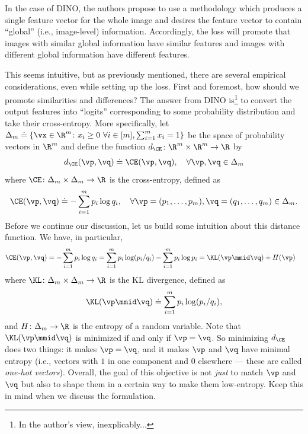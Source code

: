\documentclass[../../book-main.tex]{subfiles}
\begin{document}
In the case of DINO, the authors propose to use a methodology which produces a single feature vector for the whole image and desires the feature vector to contain ``global'' (i.e., image-level) information. Accordingly, the loss will promote that images with similar global information have similar features and images with different global information have different features.

This seems intuitive, but as previously mentioned, there are several empirical considerations, even while setting up the loss. First and foremost, how should we promote similarities and differences? The answer from DINO \citep{caron2021emerging} is\footnote{In the author's view, inexplicably...} to convert the output features into ``logits'' corresponding to some probability distribution and take their cross-entropy. More specifically, let \(\Delta_{m} \doteq \{\vx \in \R^{m} \colon x_{i} \geq 0\ \forall i \in [m], \sum_{i = 1}^{m}x_{i} = 1\}\) be the space of probability vectors in \(\R^{m}\) and define the function \(d_{\CE} \colon \R^{m} \times \R^{m} \to \R\) by
 \begin{equation}\label{eq:cross_entropy_difference}
    d_{\CE}(\vp, \vq) \doteq \CE(\vp, \vq), \quad \forall \vp, \vq \in \Delta_{m}
 \end{equation}
 where \(\CE \colon \Delta_{m} \times \Delta_{m} \to \R\) is the cross-entropy, defined as 
 \begin{equation}\label{eq:expts_def_ce}
    \CE(\vp, \vq) \doteq -\sum_{i = 1}^{m}p_{i}\log q_{i}, \quad \forall \vp = (p_{1}, \dots, p_{m}), \vq = (q_{1}, \dots, q_{m}) \in \Delta_{m}.
 \end{equation}
 Before we continue our discussion, let us build some intuition about this distance function. We have, in particular,
 \begin{align}
    \CE(\vp, \vq)
    &= -\sum_{i = 1}^{m}p_{i}\log q_{i} = \sum_{i = 1}^{m}p_{i}\log(p_{i}/q_{i})
     - \sum_{i = 1}^{m}p_{i}\log p_{i} = \KL(\vp\mmid \vq) + H(\vp)
 \end{align}
 where \(\KL \colon \Delta_{m} \times \Delta_{m} \to \R\) is the KL divergence, defined as 
 \begin{equation}
    \KL(\vp\mmid \vq) \doteq \sum_{i = 1}^{m}p_{i}\log(p_{i}/q_{i}),
 \end{equation}
 and \(H \colon \Delta_{m} \to \R\) is the entropy of a random variable. Note
 that \(\KL(\vp\mmid \vq)\) is minimized if and only if \(\vp = \vq\). So minimizing \(d_{\CE}\) does two things: it makes \(\vp = \vq\), and it makes \(\vp\) and \(\vq\) have minimal entropy (i.e., vectors with \(1\) in one component and \(0\) elsewhere --- these are called \textit{one-hot vectors}). Overall, the goal of this objective is not \textit{just} to match \(\vp\) and \(\vq\) but also to shape them in a certain way to make them low-entropy. Keep this in mind when we discuss the formulation.
\end{document}
